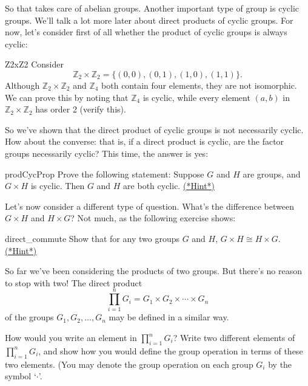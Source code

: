 So that takes care of abelian groups. Another important type of group is cyclic groups. We'll talk a lot more later about direct products of cyclic groups. For now, let's consider first of all whether the product of cyclic groups is always cyclic: 

\begin{example}{Z2xZ2}
Consider
\[
{\mathbb Z}_2 \times {\mathbb Z}_2 = \{ (0, 0), (0, 1), (1, 0),(1, 1) \}.
\]
Although ${\mathbb Z}_2 \times {\mathbb Z}_2$ and ${\mathbb Z}_4$ both contain four elements,  they are not isomorphic. We can prove this by noting that ${\mathbb Z}_4$ is cyclic, while  every element $(a,b)$ in ${\mathbb Z}_2 \times {\mathbb Z}_2$ has order 2 (verify this).	
\end{example}

So we've shown that the direct product of cyclic groups is not necessarily cyclic. How about the converse:  that is, if a direct product is cyclic, are the factor groups necessarily cyclic?  This time, the answer is yes:

\begin{exercise}{prodCycProp}
Prove  the following statement: Suppose $G$ and $H$ are groups, and $G \times H$ is cyclic. Then $G$ and $H$ are both cyclic. 
\hyperref[sec:isomorph:hints]{(*Hint*)}
\end{exercise}	

Let's now consider a different type of question. What's the difference between $G \times H$ and $H \times G$?  Not much, as the following exercise shows:
 
\begin{exercise}{direct_commute}
Show that for any two groups $G$ and $H$,  $G \times H \cong H \times G$.
\hyperref[sec:isomorph:hints]{(*Hint*)}
\end{exercise}


So far we've been considering the products of two groups. But there's no reason to stop with two! The direct product
\[
\prod_{i = 1}^n G_i = G_1 \times G_2 \times \cdots \times G_n
\]
of the groups $G_1, G_2, \ldots, G_n$ may be defined in a similar way. 

\begin{exercise}{}
How would you write an element in $\prod_{i = 1}^n G_i$? Write two different elements of $\prod_{i = 1}^n G_i$, and show how you would define the group operation in terms of these two elements. (You may denote the group operation on each group $G_i$ by the symbol `$\cdot$'.
\end{exercise}	

